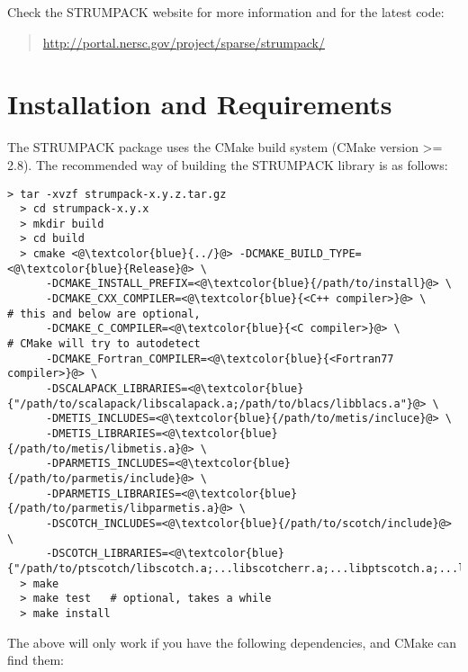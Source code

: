 \documentclass{article}
\begin{document}
\noindent Check the STRUMPACK website for more information and for the
latest code:
\begin{quote}
  \url{http://portal.nersc.gov/project/sparse/strumpack/}
\end{quote}


\section{Installation and Requirements}\label{sec::installation}
The STRUMPACK package uses the CMake build system (CMake version >=
2.8). The recommended way of building the STRUMPACK library is as
follows:
\begin{lstlisting}[style=bash]
  > tar -xvzf strumpack-x.y.z.tar.gz
  > cd strumpack-x.y.x
  > mkdir build
  > cd build
  > cmake <@\textcolor{blue}{../}@> -DCMAKE_BUILD_TYPE=<@\textcolor{blue}{Release}@> \
      -DCMAKE_INSTALL_PREFIX=<@\textcolor{blue}{/path/to/install}@> \
      -DCMAKE_CXX_COMPILER=<@\textcolor{blue}{<C++ compiler>}@> \                           # this and below are optional,
      -DCMAKE_C_COMPILER=<@\textcolor{blue}{<C compiler>}@> \                               # CMake will try to autodetect
      -DCMAKE_Fortran_COMPILER=<@\textcolor{blue}{<Fortran77 compiler>}@> \
      -DSCALAPACK_LIBRARIES=<@\textcolor{blue}{"/path/to/scalapack/libscalapack.a;/path/to/blacs/libblacs.a"}@> \
      -DMETIS_INCLUDES=<@\textcolor{blue}{/path/to/metis/incluce}@> \
      -DMETIS_LIBRARIES=<@\textcolor{blue}{/path/to/metis/libmetis.a}@> \
      -DPARMETIS_INCLUDES=<@\textcolor{blue}{/path/to/parmetis/include}@> \
      -DPARMETIS_LIBRARIES=<@\textcolor{blue}{/path/to/parmetis/libparmetis.a}@> \
      -DSCOTCH_INCLUDES=<@\textcolor{blue}{/path/to/scotch/include}@> \
      -DSCOTCH_LIBRARIES=<@\textcolor{blue}{"/path/to/ptscotch/libscotch.a;...libscotcherr.a;...libptscotch.a;...libptscotcherr.a"}@>
  > make
  > make test   # optional, takes a while
  > make install
\end{lstlisting}
The above will only work if you have the following dependencies, and
CMake can find them:
\end{document}
